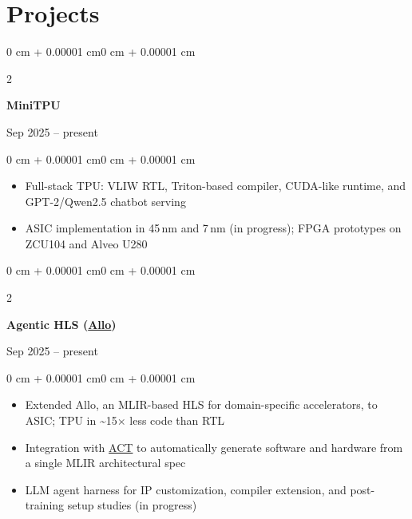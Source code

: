 \documentclass[10pt, letterpaper]{article}
\newenvironment{highlights}{
    \begin{itemize}[
        topsep=0.06 cm, parsep=0.06 cm, partopsep=0pt,
        itemsep=0pt, leftmargin=0 cm + 10pt
    ]
}{
    \end{itemize}
}
\newenvironment{onecolentry}{
    \begin{adjustwidth}{0 cm + 0.00001 cm}{0 cm + 0.00001 cm}
}{
    \end{adjustwidth}
}
\newenvironment{twocolentry}[2][]{
    \onecolentry
    \def\secondColumn{#2}
    \setcolumnwidth{\fill, 3.4 cm}
    \begin{paracol}{2}
}{
    \switchcolumn \raggedleft \secondColumn
    \end{paracol}
    \endonecolentry
}
\begin{document}
    \section{Projects}

        \begin{twocolentry}{Sep 2025 -- present}
            \textbf{MiniTPU}
        \end{twocolentry}

        \vspace{0.12 cm}
        \begin{onecolentry}
            \begin{highlights}
                \item Full-stack TPU: VLIW RTL, Triton-based compiler, CUDA-like runtime, and GPT-2/Qwen2.5 chatbot serving
                \item ASIC implementation in 45\,nm and 7\,nm (in progress); FPGA prototypes on ZCU104 and Alveo U280
            \end{highlights}
        \end{onecolentry}

        \vspace{0.18 cm}

        \begin{twocolentry}{Sep 2025 -- present}
            \textbf{Agentic HLS (\href{https://github.com/cornell-zhang/allo}{Allo})}
        \end{twocolentry}

        \vspace{0.12 cm}
        \begin{onecolentry}
            \begin{highlights}
                \item Extended Allo, an MLIR-based HLS for domain-specific accelerators, to ASIC; TPU in \textasciitilde15$\times$ less code than RTL
                \item Integration with \href{https://act-compiler.github.io/}{ACT} to automatically generate software and hardware from a single MLIR architectural spec
                \item LLM agent harness for IP customization, compiler extension, and post-training setup studies (in progress)
            \end{highlights}
        \end{onecolentry}


\end{document}
